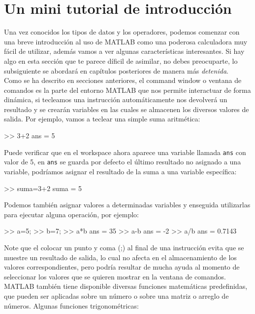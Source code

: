 \section{Un mini tutorial de introducción}

Una vez conocidos los tipos de datos y los operadores, podemos comenzar
con una breve introducción al uso de MATLAB como una poderosa
calculadora muy fácil de utilizar, además vamos a ver algunas
características interesantes. Si hay algo en esta sección que te parece
díficil de asimilar, no debes preocuparte, lo subsiguiente se abordará
en capítulos posteriores de manera más \emph{detenida}.\\

Como se ha descrito en secciones anteriores, el command window o ventana
de comandos es la parte del entorno MATLAB que nos permite interactuar
de forma dinámica, si tecleamos una instrucción automáticamente nos
devolverá un resultado y se crearán variables en las cuales se almacenen
los diversos valores de salida. Por ejemplo, vamos a teclear una simple
suma aritmética:

\begin{matlab}
>> 3+2
ans =
     5
\end{matlab}

Puede verificar que en el workspace ahora aparece una variable llamada
\texttt{ans} con valor de 5, en \texttt{ans} se guarda por defecto el
último resultado no asignado a una variable, podríamos asignar el
resultado de la suma a una variable específica:

\begin{matlab}
>> suma=3+2
suma =
     5
\end{matlab}

Podemos también asignar valores a determinadas variables y enseguida
utilizarlas para ejecutar alguna operación, por ejemplo:

\begin{matlab}
>> a=5;
>> b=7;
>> a*b
ans =
    35
>> a-b
ans =
    -2
>> a/b
ans =
    0.7143
\end{matlab}

Note que el colocar un punto y coma (;) al final de una instrucción
evita que se muestre un resultado de salida, lo cual no afecta en el
almacenamiento de los valores correspondientes, pero podría resultar de
mucha ayuda al momento de seleccionar los valores que se quieren mostrar
en la ventana de comandos.\\

MATLAB también tiene disponible diversas funciones matemáticas
predefinidas, que pueden ser aplicadas sobre un número o sobre una
matriz o arreglo de números. Algunas funciones trigonométricas:

